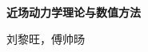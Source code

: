 \begin{titlepage}
  \centering
  \vspace*{4cm}
  {\Huge\bfseries 近场动力学理论与数值方法\par}
  \vspace{2cm}
  {\Large 刘黎旺，傅帅旸\par}
  \vfill
\end{titlepage}
